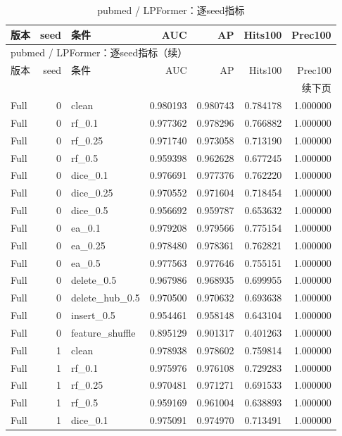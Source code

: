 \documentclass[UTF8,a4paper,11pt,fontset=fandol]{ctexart}
\begin{document}
{\footnotesize
\setlength{\tabcolsep}{3pt}
\begin{longtable}{lrlrrrr}
\caption{pubmed / LPFormer：逐seed指标}\\
\toprule
版本 & seed & 条件 & AUC & AP & Hits100 & Prec100 \\
\midrule
\endfirsthead
\multicolumn{7}{l}{pubmed / LPFormer：逐seed指标（续）}\\
\toprule
版本 & seed & 条件 & AUC & AP & Hits100 & Prec100 \\
\midrule
\endhead
\midrule\multicolumn{7}{r}{续下页}\\
\endfoot
\bottomrule\endlastfoot
Full & 0 & clean & 0.980193 & 0.980743 & 0.784178 & 1.000000 \\
Full & 0 & rf\_0.1 & 0.977362 & 0.978296 & 0.766882 & 1.000000 \\
Full & 0 & rf\_0.25 & 0.971740 & 0.973058 & 0.713190 & 1.000000 \\
Full & 0 & rf\_0.5 & 0.959398 & 0.962628 & 0.677245 & 1.000000 \\
Full & 0 & dice\_0.1 & 0.976691 & 0.977376 & 0.762220 & 1.000000 \\
Full & 0 & dice\_0.25 & 0.970552 & 0.971604 & 0.718454 & 1.000000 \\
Full & 0 & dice\_0.5 & 0.956692 & 0.959787 & 0.653632 & 1.000000 \\
Full & 0 & ea\_0.1 & 0.979208 & 0.979566 & 0.775154 & 1.000000 \\
Full & 0 & ea\_0.25 & 0.978480 & 0.978361 & 0.762821 & 1.000000 \\
Full & 0 & ea\_0.5 & 0.977563 & 0.977646 & 0.755151 & 1.000000 \\
Full & 0 & delete\_0.5 & 0.967986 & 0.968935 & 0.699955 & 1.000000 \\
Full & 0 & delete\_hub\_0.5 & 0.970500 & 0.970632 & 0.693638 & 1.000000 \\
Full & 0 & insert\_0.5 & 0.954461 & 0.958148 & 0.643104 & 1.000000 \\
Full & 0 & feature\_shuffle & 0.895129 & 0.901317 & 0.401263 & 1.000000 \\
Full & 1 & clean & 0.978938 & 0.978602 & 0.759814 & 1.000000 \\
Full & 1 & rf\_0.1 & 0.975976 & 0.976108 & 0.729283 & 1.000000 \\
Full & 1 & rf\_0.25 & 0.970481 & 0.971271 & 0.691533 & 1.000000 \\
Full & 1 & rf\_0.5 & 0.959169 & 0.961004 & 0.638893 & 1.000000 \\
Full & 1 & dice\_0.1 & 0.975091 & 0.974970 & 0.713491 & 1.000000 \\

\end{longtable}}
\end{document}
